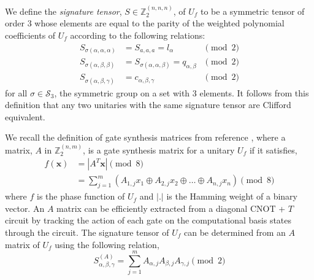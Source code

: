 \documentclass[notitlepage]{article}
\theoremstyle{definition}
\theoremstyle{problem}
\theoremstyle{lemma}
\begin{document}
We define the \emph{signature tensor}, $S \in \mathbb{Z}_2^{(n,n,n)}$, of $U_f$ to be a symmetric tensor of order 3 whose elements are equal to the parity of the weighted polynomial coefficients of $U_f$ according to the following relations:
\begin{subequations}
	\label{eq_def_sig}
	\begin{align} 
	S_{\sigma(\alpha,\alpha,\alpha)}& = S_{a,a,a} = l_{\alpha} &\pmod{2} \label{e_def_sig_1}\\
	S_{\sigma(\alpha,\beta,\beta)}& = S_{\sigma(\alpha,\alpha,\beta)} = q_{\alpha,\beta} &\pmod{2} \label{e_def_sig_2}\\
	S_{\sigma(\alpha,\beta,\gamma)}& = c_{\alpha,\beta,\gamma} &\pmod{2} \label{e_def_sig_3}
	\end{align}
\end{subequations}
for all $\sigma \in \mathcal{S}_3$, the symmetric group on a set with 3 elements. It follows from this definition that any two unitaries with the same signature tensor are Clifford equivalent.

We recall the definition of gate synthesis matrices from reference \cite{4_Campbell_2017}, where a matrix, $A$ in $\mathbb{Z}_2^{(n,m)}$, is a gate synthesis matrix for a unitary $U_f$ if it satisfies,
\begin{align}
\label{eq_gsm}
f(\mathbf{x}) &= |A^T\mathbf{x}| \pmod{8} \\&= \sum_{j=1}^{m}(A_{1,j}x_1 \oplus A_{2,j}x_2 \oplus \dots \oplus A_{n,j}x_n) \pmod{8}
\end{align}
where $f$ is the phase function of $U_f$ and $|.|$ is the Hamming weight of a binary vector. An $A$ matrix can be efficiently extracted from a diagonal CNOT + $T$ circuit by tracking the action of each gate on the computational basis states through the circuit. 
The signature tensor of $U_f$ can be determined from an $A$ matrix of $U_f$ using the following relation,
\begin{equation}
	\label{eq_sig}
	S^{(A)}_{\alpha,\beta,\gamma} = \sum_{j=1}^m A_{\alpha,j}A_{\beta,j}A_{\gamma,j} \pmod{2}
\end{equation}
\end{document}
